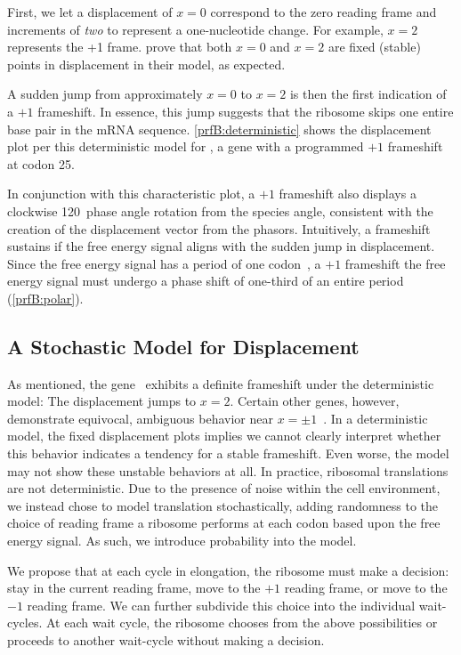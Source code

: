 \documentclass[12pt, draft]{article}
\numberwithin{equation}{section}
\begin{document}
First, we let a displacement of $x = 0$ correspond to the zero reading frame and increments of
\emph{two} to represent a one-nucleotide change. For example, $x =2$ represents the +1 frame.
\citet{lalit:embs} prove that both $x = 0$ and $x = 2$ are fixed (stable) points in displacement in their model,
as expected.

A sudden jump from approximately $x = 0$ to $x = 2$ is then the first indication of a $+1$ frameshift.
In essence, this jump suggests that the ribosome skips one entire base pair in the mRNA sequence.
\autoref{prfB:deterministic} shows the displacement plot per this deterministic model for \prfB, 
a gene with a programmed $+1$ frameshift at codon 25.

In conjunction with this characteristic plot, a $+1$ frameshift also displays a clockwise 120\degree\
phase angle rotation from the species angle, consistent with the
creation of the displacement vector from the phasors.
Intuitively, a frameshift sustains if the free energy signal aligns with the sudden jump in displacement.
Since the free energy signal has a period of one codon~\cite{lalit:mechanics}, a $+1$ frameshift the free energy signal
must undergo a phase shift of one-third of an entire period (\autoref{prfB:polar}).

\subsection{A Stochastic Model for Displacement}
\label{stochastic}

As mentioned, the gene \prfB\ exhibits a definite frameshift under the
deterministic model: The displacement jumps to $x=2$.  Certain other
genes, however, demonstrate equivocal, ambiguous behavior near $x = \pm
1$~\cite{lalit:embs}.  In a deterministic model, the fixed
displacement plots implies we cannot clearly interpret whether this
behavior indicates a tendency for a stable frameshift. Even worse,
the model may not show these unstable behaviors at all. In practice,
ribosomal translations are not deterministic. Due to the presence of
noise within the cell environment, we instead chose to model
translation stochastically, adding randomness to the choice of reading
frame a ribosome performs at each codon based upon the free energy signal.
As such, we introduce probability into the model.

We propose that at each cycle in elongation, the ribosome must make a
decision: stay in the current reading frame, move to the $+1$ reading
frame, or move to the $-1$ reading frame.  We can further subdivide
this choice into the individual wait-cycles.  At each wait cycle, the
ribosome chooses from the above possibilities or proceeds to another
wait-cycle without making a decision.
\end{document}
